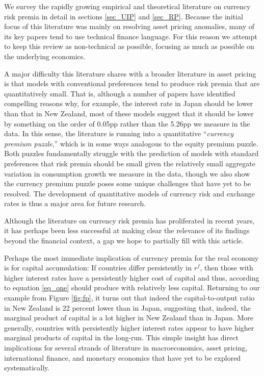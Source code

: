 \documentclass{ar-1col}
\begin{document}
We survey the rapidly growing empirical and theoretical literature on currency risk premia in detail in sections \ref{sec_UIP} and \ref{sec_RP}. Because the initial focus of this literature was mainly on resolving asset pricing anomalies, many of its key papers tend to use technical finance language. For this reason we attempt to keep this review as non-technical as possible, focusing as much as possible on the underlying economics.

A major difficulty this literature shares with a broader literature in asset pricing is that models with conventional preferences tend to produce risk premia that are quantitatively small. That is, although a number of papers have identified compelling reasons why, for example, the interest rate in Japan should be lower than that in New Zealand, most of these models suggest that it should be lower by something on the order of 0.05pp rather than the 5.26pp we measure in the data. In this sense, the literature is running into a quantitative ``\textit{currency premium puzzle},'' which is in some ways analogous to the equity premium puzzle. Both puzzles fundamentally struggle with the prediction of models with standard preferences that risk premia should be small given the relatively small aggregate variation in consumption growth we measure in the data, though we also show the currency premium puzzle poses some unique challenges that have yet to be resolved. The development of quantitative models of currency risk and exchange rates is thus a major area for future research.

Although the literature on currency risk premia has proliferated in recent years, it has perhaps been less successful at making clear the relevance of its findings beyond the financial context, a gap we hope to partially fill with this article.

Perhaps the most immediate implication of currency premia for the real economy is for capital accumulation: If countries differ persistently in $r^f$, then those with higher interest rates have a persistently higher cost of capital and thus, according to equation \ref{eq_one} should produce with relatively less capital. Returning to our example from Figure \ref{fig:fp}, it turns out that indeed the capital-to-output ratio in New Zealand is 22 percent lower than in Japan, suggesting that, indeed, the marginal product of capital is a lot higher in New Zealand than in Japan. More generally, countries with persistently higher interest rates appear to have higher marginal products of capital in the long-run. This simple insight has direct implications for several strands of literature in macroeconomics, asset pricing, international finance, and monetary economics that have yet to be explored systematically.
\end{document}
